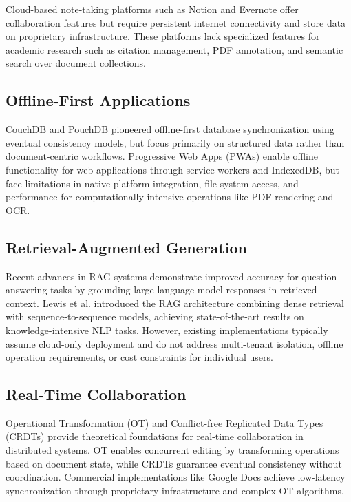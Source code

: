 \documentclass[conference]{IEEEtran}
\begin{document}
Cloud-based note-taking platforms such as Notion and Evernote offer collaboration features but require persistent internet connectivity and store data on proprietary infrastructure. These platforms lack specialized features for academic research such as citation management, PDF annotation, and semantic search over document collections.

\subsection{Offline-First Applications}

CouchDB and PouchDB pioneered offline-first database synchronization \cite{b3} using eventual consistency models, but focus primarily on structured data rather than document-centric workflows. Progressive Web Apps (PWAs) enable offline functionality for web applications through service workers and IndexedDB, but face limitations in native platform integration, file system access, and performance for computationally intensive operations like PDF rendering and OCR.

\subsection{Retrieval-Augmented Generation}

Recent advances in RAG systems \cite{b4} demonstrate improved accuracy for question-answering tasks by grounding large language model responses in retrieved context. Lewis et al. introduced the RAG architecture combining dense retrieval with sequence-to-sequence models, achieving state-of-the-art results on knowledge-intensive NLP tasks. However, existing implementations typically assume cloud-only deployment and do not address multi-tenant isolation, offline operation requirements, or cost constraints for individual users.


\subsection{Real-Time Collaboration}

Operational Transformation (OT) \cite{b5} and Conflict-free Replicated Data Types (CRDTs) \cite{b6} provide theoretical foundations for real-time collaboration in distributed systems. OT enables concurrent editing by transforming operations based on document state, while CRDTs guarantee eventual consistency without coordination. Commercial implementations like Google Docs achieve low-latency synchronization through proprietary infrastructure and complex OT algorithms.
\end{document}
